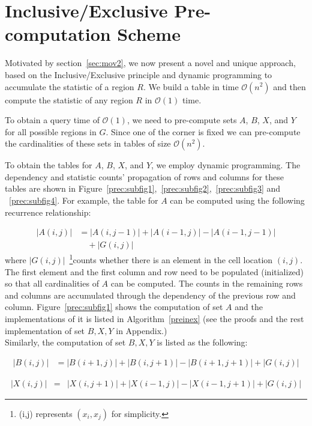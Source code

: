 \documentclass[AMA,LATO1COL]{WileyNJD-v2}
\newcommand\bigo{\mathcal O}
\begin{document}
\section {Inclusive/Exclusive Pre-computation Scheme} \label{DM}

Motivated by section~\ref{sec:mov2}, we now present a novel and unique approach, based on the Inclusive/Exclusive principle and
dynamic programming to accumulate the statistic of a region $R$. We build a table in time $\bigo(n^2)$ and then compute the statistic of any region $R$ in $\bigo(1)$ time.

To obtain a query time of $\bigo(1)$, we need to pre-compute sets $A$, $B$, $X$, and $Y$ for all possible regions in $G$. Since one of the corner is fixed we can pre-compute the cardinalities of these sets in tables of size $\bigo(n^2)$.

To obtain the tables for $A$, $B$, $X$, and $Y$, we employ dynamic programming. The dependency and statistic counts' propagation of rows and columns for these tables are shown in Figure~\ref{prec:subfig1},~\ref{prec:subfig2},~\ref{prec:subfig3} and ~\ref{prec:subfig4}. For example, the table for $A$ can be computed using the following recurrence relationship:


\begin{eqnarray}
|A(i,j)|  &= |A(i,j-1)| + |A(i-1,j)| - |A(i-1,j-1)| \\& \quad + |G(i,j)|
\end{eqnarray}
\normalsize
where $|G(i,j)|$~\footnote{(i,j) represents $(x_i,x_j)$ for simplicity.}counts whether there is an element in the cell location $(i,j)$. The first element and the first column and row need to be populated (initialized) so that all cardinalities of $A$ can be computed. The counts in the remaining rows and columns are accumulated through the dependency of the previous row and column. Figure~\ref{prec:subfig1} shows the computation of set $A$ and the implementations of it is listed in Algorithm~\ref{preinex} (see the proofs and the rest implementation of set $B,X,Y$ in Appendix.)\\

Similarly, the computation of set $B,X,Y$ is listed as the following:

\begin{eqnarray}
|B(i,j)|  &= |B(i+1,j)| + |B(i,j+1)| - |B(i+1,j+1)| + |G(i,j)|
\end{eqnarray}
\normalsize

\begin{eqnarray}
|X(i,j)|  &= & |X(i,j+1)| + |X(i-1,j)| - |X(i-1,j+1)| + |G(i,j)|
\end{eqnarray}
\normalsize
\end{document}
